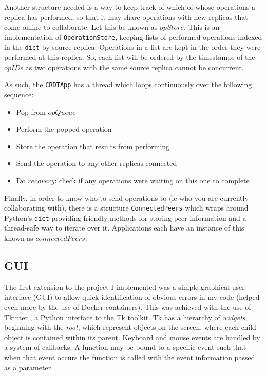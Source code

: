 \documentclass[diss.tex]{subfiles}
\begin{document}
Another structure needed is a way to keep track of which of whose operations a replica has performed, so that it may share operations with new replicas that come online to collaborate. Let this be known as $opStore$. This is an implementation of \texttt{OperationStore}, keeping lists of performed operations indexed in the \texttt{dict} by source replica. Operations in a list are kept in the order they were performed at this replica. So, each list will be ordered by the timestamps of the $opID$s as two operations with the same source replica cannot be concurrent. 

As such, the \texttt{CRDTApp} has a thread which loops continuously over the following sequence:

\begin{itemize}
\item Pop from $opQueue$
\item Perform the popped operation
\item Store the operation that results from performing
\item Send the operation to any other replicas connected
\item Do $recovery$: check if any operations were waiting on this one to complete
\end{itemize}

Finally, in order to know who to send operations to (ie who you are currently collaborating with), there is a structure \texttt{ConnectedPeers} which wraps around Python's \texttt{dict} providing friendly methods for storing peer information and a thread-safe way to iterate over it. Applications each have an instance of this known as $connectedPeers$.
%
%
%
%
%
%

\subsection{GUI}
The first extension to the project I implemented was a simple graphical user interface (GUI) to allow quick identification of obvious errors in my code (helped even more by the use of Docker containers). This was achieved with the use of Tkinter \cite{tkinter}, a Python interface to the Tk toolkit. Tk has a hierarchy of \textit{widgets}, beginning with the \textit{root}, which represent objects on the screen, where each child object is contained within its parent. Keyboard and mouse events are handled by a system of callbacks. A function may be bound to a specific event such that when that event occurs the function is called with the event information passed as a parameter.
\end{document}
